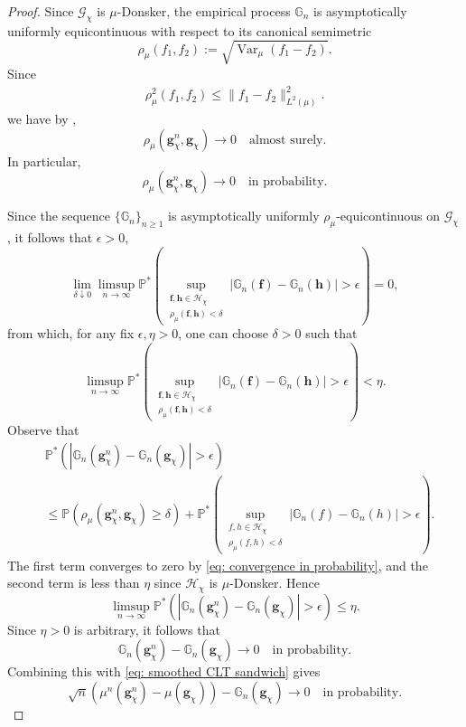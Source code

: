 \documentclass{amsart}
\theoremstyle{plain}
\numberwithin{equation}{section}\newtheorem{theorem}{Theorem}[section]
\theoremstyle{remark}
\begin{document}
\begin{proof}
Since $\mathcal G_\chi$ is $\mu$-Donsker, the empirical process
$\mathbb G_n$ is asymptotically uniformly equicontinuous with respect to its canonical semimetric
\[
    \rho_\mu(f_1,f_2)
    :=
    \sqrt{\operatorname{Var}_\mu(f_1-f_2)}.
\]
Since
\[
\begin{aligned}
    \rho_\mu^2(f_1,f_2) \leq \|f_1-f_2\|_{L^2(\mu)}^2.
\end{aligned}
\]
we have by , 
\[
    \rho_\mu(\bm g_\chi^n,\bm g_\chi)
    \longrightarrow 0
    \quad \text{almost surely}.
\]
In particular,
\begin{equation}\label{eq: convergence in probability}
    \rho_\mu(\bm g_\chi^n,\bm g_\chi)
    \longrightarrow 0
    \quad \text{in probability}.
\end{equation}



Since the sequence
$\{\mathbb G_n\}_{n\geq 1}$ is asymptotically uniformly
$\rho_\mu$-equicontinuous on $\mathcal G_\chi$, it follows that $\epsilon>0$,
\[
    \lim_{\delta\downarrow 0}
    \limsup_{n\to\infty}
    \mathbb P^*\left(
        \sup_{\substack{\bm{f},\bm{h}\in\mathcal{H}_\chi\\
                        \rho_\mu(\bm{f}, \bm{h})<\delta}}
        \left|\mathbb G_n(\bm{f})-\mathbb G_n(\bm{h})\right|
        >\epsilon
    \right)
    =0,
\]
from which, for any fix $\epsilon,\eta>0$, one can choose $\delta>0$ such that
\[
    \limsup_{n\to\infty}
    \mathbb P^*\left(
        \sup_{\substack{\bm{f},\bm{h}\in\mathcal{H}_\chi\\
                        \rho_\mu(\bm{f}, \bm{h})<\delta}}
        \left|\mathbb G_n(\bm{f})-\mathbb G_n(\bm{h})\right|
        >\epsilon
    \right)
    <\eta.
\]
Observe that
\[
\begin{aligned}
    &\mathbb P^*\left(
        \left|
            \mathbb G_n(\bm g_\chi^n)
            -
            \mathbb G_n(\bm g_\chi)
        \right|
        >\epsilon
    \right)\\
    &\leq
    \mathbb P\left(
        \rho_\mu(\bm g_\chi^n,\bm g_\chi)\geq\delta
    \right)  +
    \mathbb P^*\left(
        \sup_{\substack{f,h\in\mathcal{H}_\chi\\
                        \rho_\mu(f,h)<\delta}}
        \left|\mathbb G_n(f)-\mathbb G_n(h)\right|
        >\epsilon
    \right).
\end{aligned}
\]
The first term converges to zero by \eqref{eq: convergence in probability}, and the second
term is less than $\eta$ since $\mathcal{H}_\chi$ is $\mu$-Donsker. Hence
\[
    \limsup_{n\to\infty}
    \mathbb P^*\left(
        \left|
            \mathbb G_n(\bm g_\chi^n)
            -
            \mathbb G_n(\bm g_\chi)
        \right|
        >\epsilon
    \right)
    \leq \eta.
\]
Since $\eta>0$ is arbitrary, it follows that
\[
    \mathbb G_n(\bm g_\chi^n)
    -
    \mathbb G_n(\bm g_\chi)
    \longrightarrow 0
    \quad \text{in probability}.
\]
Combining this with
\eqref{eq: smoothed CLT sandwich} gives
\[
    \sqrt n(\mu^n(\bm g_\chi^n)- \mu(\bm g_\chi))
    -
    \mathbb G_n(\bm g_\chi)
    \longrightarrow 0 \quad \text{in probability}.
\]




\end{proof}
\end{document}
